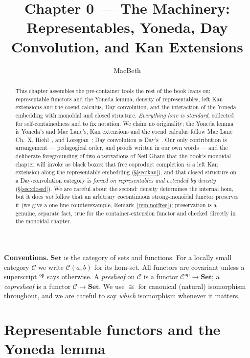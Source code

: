 \documentclass[11pt]{article}
\title{Chapter 0 --- The Machinery:\\ Representables, Yoneda, Day Convolution, and Kan Extensions}
\author{MacBeth}
\date{}
\theoremstyle{plain}
\theoremstyle{definition}
\newcommand{\Set}{\mathbf{Set}}
\newcommand{\op}{^{\mathrm{op}}}
\newcommand{\iso}{\cong}
\begin{document}
\maketitle

\begin{abstract}
This chapter assembles the pre-container tools the rest of the book leans on:
representable functors and the Yoneda lemma, density of representables, left
Kan extensions and the coend calculus, Day convolution, and the interaction of
the Yoneda embedding with monoidal and closed structure. \emph{Everything here
is standard}, collected for self-containedness and to fix notation. We claim no
originality: the Yoneda lemma is Yoneda's and Mac Lane's; Kan extensions and the
coend calculus follow Mac Lane~\cite{MacLane} Ch.~X, Riehl~\cite{Riehl}, and
Loregian~\cite{Loregian}; Day convolution is Day's~\cite{Day1970}. Our only
contribution is arrangement --- pedagogical order, and proofs written in our own
words --- and the deliberate foregrounding of two observations of Neil Ghani that
the book's monoidal chapter will invoke as black boxes: that free coproduct
completion \emph{is} a left Kan extension along the representable embedding
(\S\ref{sec:kan}), and that closed structure on a Day-convolution category is
\emph{forced on representables and extended by density}
(\S\ref{sec:closed}). We are careful about the second: density determines the
internal hom, but it does \emph{not} follow that an arbitrary cocontinuous
strong-monoidal functor preserves it (we give a one-line counterexample,
Remark~\ref{rem:notfree}); preservation is a genuine, separate fact, true for the
container-extension functor and checked directly in the monoidal chapter.
\end{abstract}

\tableofcontents

\bigskip
\noindent\textbf{Conventions.} $\Set$ is the category of sets and functions.
For a locally small category $\mathcal{C}$ we write $\mathcal{C}(a,b)$ for its
hom-set. All functors are covariant unless a superscript $\op$ says otherwise. A
\emph{presheaf} on $\mathcal{C}$ is a functor $\mathcal{C}\op\to\Set$; a
\emph{copresheaf} is a functor $\mathcal{C}\to\Set$. We use $\iso$ for
canonical (natural) isomorphism throughout, and we are careful to say
\emph{which} isomorphism whenever it matters.

\section{Representable functors and the Yoneda lemma}
\label{sec:yoneda}
\end{document}
